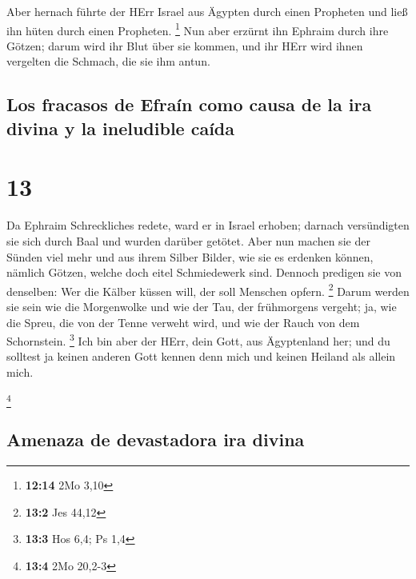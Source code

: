  Aber hernach führte der HErr Israel aus Ägypten durch
einen Propheten und ließ ihn hüten durch einen Propheten. \footnote{\textbf{12:14}
  2Mo 3,10}  Nun aber erzürnt ihn Ephraim durch ihre
Götzen; darum wird ihr Blut über sie kommen, und ihr HErr wird ihnen
vergelten die Schmach, die sie ihm antun.

\hypertarget{los-fracasos-de-efrauxedn-como-causa-de-la-ira-divina-y-la-ineludible-cauxedda}{%
\subsection{Los fracasos de Efraín como causa de la ira divina y la
ineludible
caída}\label{los-fracasos-de-efrauxedn-como-causa-de-la-ira-divina-y-la-ineludible-cauxedda}}

\hypertarget{section-12}{%
\section{13}\label{section-12}}

 Da Ephraim Schreckliches redete, ward er in Israel
erhoben; darnach versündigten sie sich durch Baal und wurden darüber
getötet.  Aber nun machen sie der Sünden viel mehr und aus
ihrem Silber Bilder, wie sie es erdenken können, nämlich Götzen, welche
doch eitel Schmiedewerk sind. Dennoch predigen sie von denselben: Wer
die Kälber küssen will, der soll Menschen opfern. \footnote{\textbf{13:2}
  Jes 44,12}  Darum werden sie sein wie die Morgenwolke
und wie der Tau, der frühmorgens vergeht; ja, wie die Spreu, die von der
Tenne verweht wird, und wie der Rauch von dem Schornstein. \footnote{\textbf{13:3}
  Hos 6,4; Ps 1,4}  Ich bin aber der HErr, dein Gott, aus
Ägyptenland her; und du solltest ja keinen anderen Gott kennen denn mich
und keinen Heiland als allein mich.

\footnote{\textbf{13:4} 2Mo 20,2-3}

\hypertarget{amenaza-de-devastadora-ira-divina}{%
\subsection{Amenaza de devastadora ira
divina}\label{amenaza-de-devastadora-ira-divina}}

